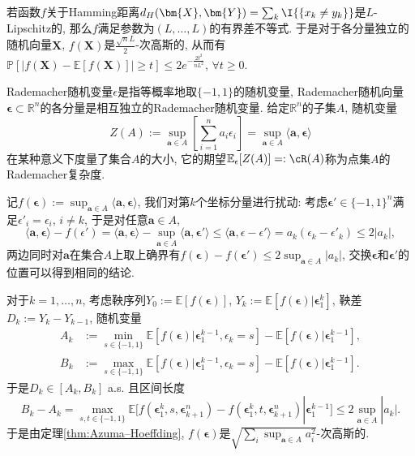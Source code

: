 \begin{example}
	若函数$f$关于Hamming距离$d_H(\bm{X}, \bm{Y}) = \sum_k \I{\{x_k \neq y_k\}}$是$L$-Lipschitz的, 那么$f$满足参数为$(L, \dots, L)$的有界差不等式. 
	于是对于各分量独立的随机向量$\bm{X}$, $f(\bm{X})$是$\frac{\sqrt{n} L}{2}$-次高斯的, 从而有$\mathbb{P}[|f(\bm{X}) - \mathbb{E}[f(\bm{X})]| \geq t] \leq 2 e^{-\frac{2 t^2}{n L^2}}$, $\forall t \geq 0$. 
\end{example}

\begin{example}[点集的Rademacher复杂度]\label{ex:RCofPtSet}
	Rademacher随机变量$\epsilon$是指等概率地取$\{-1, 1\}$的随机变量, 
	Rademacher随机向量$\bm{\epsilon} \subset \mathbb{R}^n$的各分量是相互独立的Rademacher随机变量. 
	给定$\mathbb{R}^n$的子集$A$, 随机变量
	\begin{equation*}
		Z(A)
		:= \sup_{\bm{a} \in A} \left[ \sum_{i=1}^n a_i \epsilon_i \right]
		= \sup_{\bm{a} \in A} \langle \bm{a}, \bm{\epsilon} \rangle
	\end{equation*}
	在某种意义下度量了集合$A$的大小, 它的期望$\mathbb{E}_{\epsilon}[Z(A)] =: \cR(A)$称为点集$A$的Rademacher复杂度. 
	
	记$f(\bm{\epsilon}) := \sup_{\bm{a} \in A} \langle \bm{a}, \bm{\epsilon} \rangle$, 我们对第$k$个坐标分量进行扰动: 
	考虑$\bm{\epsilon}' \in \{-1, 1\}^n$满足$\epsilon'_i = \epsilon_i$, $i \neq k$, 于是对任意$\bm{a} \in A$, 
	\begin{equation*}
		\langle \bm{a}, \bm{\epsilon} \rangle - f(\epsilon')
		= \langle \bm{a}, \bm{\epsilon} \rangle - \sup_{\bm{a} \in A} \langle \bm{a}, \bm{\epsilon}' \rangle
		\leq \langle \bm{a}, \epsilon - \epsilon' \rangle
		= a_k (\epsilon_k - \epsilon'_k)
		\leq 2 |a_k|, 
	\end{equation*}
	两边同时对$\bm{a}$在集合$A$上取上确界有$f(\bm{\epsilon}) - f(\bm{\epsilon}') \leq 2 \sup_{\bm{a} \in A} |a_k|$, 交换$\bm{\epsilon}$和$\bm{\epsilon}'$的位置可以得到相同的结论. 
	
	对于$k = 1, \dots, n$, 考虑鞅序列$Y_0 := \mathbb{E}[ f(\bm{\epsilon}) ]$,  $Y_k := \mathbb{E}[ f(\bm{\epsilon}) | \bm \epsilon_1^k ]$, 鞅差$D_k := Y_k - Y_{k-1}$, 随机变量 
	\begin{align*}
		A_k &:= \min_{s \in \{-1, 1\}} \mathbb{E}[f(\bm{\epsilon})|\bm{\epsilon}_1^{k-1}, \epsilon_k = s] - \mathbb{E}[f(\bm{\epsilon})|\bm{\epsilon}_1^{k-1}], \\
		B_k &:= \max_{s \in \{-1, 1\}} \mathbb{E}[f(\bm{\epsilon})|\bm{\epsilon}_1^{k-1}, \epsilon_k = s] - \mathbb{E}[f(\bm{\epsilon})|\bm{\epsilon}_1^{k-1}]. 
	\end{align*} 
	于是$D_k \in [A_k, B_k]$ a.s. 且区间长度
	\begin{equation*}
		B_k - A_k
		= \max_{s, t \in \{-1, 1\}} \mathbb{E}[f(\bm{\epsilon}_1^k, s, \bm{\epsilon}_{k+1}^n) - f(\bm{\epsilon}_1^k, t, \bm{\epsilon}_{k+1}^n) | \bm{\epsilon}_1^{k-1}] 
		\leq 2 \sup_{\bm{a} \in A} |a_k|. 
	\end{equation*}
	于是由定理\ref{thm:Azuma–Hoeffding}, $f(\bm{\epsilon})$是$\sqrt{\sum_i \sup_{\bm{a} \in A} a_i^2}$-次高斯的. 
\end{example}
